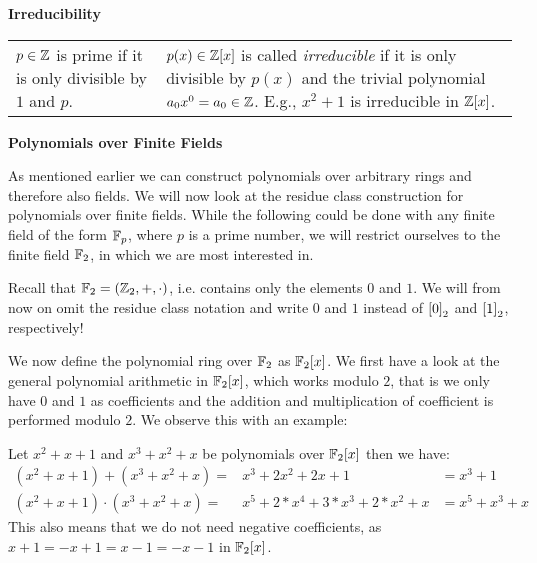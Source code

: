 

\vspace{.4cm}\textbf{Irreducibility}\vspace{.1cm}

\begin{tabular}{p{}|p{}}
  $p\in\mathbb{Z}$ is prime if it is only divisible by $1$ and $p$.  & 
  $p(x)\in\mathbb{Z}[x]$ is called \emph{irreducible} if it is only divisible by $p(x)$ and 
  the trivial polynomial $a_0x^0=a_0\in\mathbb{Z}$. E.g., $x^2+1$ is irreducible in $\mathbb{Z}[x]$.
\end{tabular}



\newpage
\textbf{\large Polynomials over Finite Fields}

As mentioned earlier we can construct polynomials over arbitrary rings and
therefore also fields. We will now look at the residue class construction for
polynomials over finite fields. While the following could be done with any
finite field of the form $\mathbb{F}_p$, where $p$ is a prime number, we will restrict
ourselves to the finite field $\mathbb{F}_2$, in which we are most interested in.

Recall that $\mathbb{F}_2=(\mathbb{Z}_2,+,\cdot)$, i.e. contains only the elements $0$ and $1$.
We will from now on omit the residue class notation and write $0$ and $1$
instead of ${{[0]}_{2}}$ and ${{[1]}_{2}}$, respectively! 

We now define the polynomial ring over $\mathbb{F}_2$ as ${ \mathbb{F}_2[x]}$. We first have a look
at the general polynomial arithmetic in ${ \mathbb{F}_2[x]}$, which works modulo $2$, that
is we only have $0$ and $1$ as coefficients and the addition and multiplication
of coefficient is performed modulo $2$. We observe this with an example:

\example Let $x^2+x+1$ and $x^3+x^2+x$ be polynomials over ${ \mathbb{F}_2[x]}$ then we have:\vspace{-.1cm}
\begin{eqnarray*}
  (x^2+x+1)+(x^3+x^2+x) = & x^3+2x^2+2x+1 & = x^3+1\\
  (x^2+x+1)\cdot(x^3+x^2+x) = & x^5+2*x^4+3*x^3+2*x^2+x & = x^5+x^3+x
\end{eqnarray*}
This also means that we do not need negative coefficients, as
$x+1{=}-x+1{=}x-1{=}-x-1$ in ${ \mathbb{F}_2[x]}$.\vspace{.2cm}


